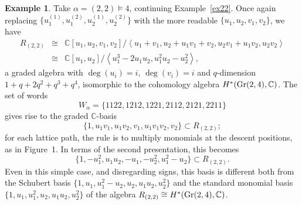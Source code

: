 \documentclass[a4paper,11pt]{amsart}
\theoremstyle{plain}
\theoremstyle{definition}
\newtheorem{example}[theorem]{Example}
\newcommand{\C}{\mathbb{C}}
\begin{document}
\begin{example} Take $\alpha=(2,2)\vDash 4$, continuing Example~\ref{ex22}. Once again replacing $\{u_1^{(1)}, u_1^{(2)}, u_2^{(1)}, u_2^{(2)}\}$ with the more readable $\{u_1, u_2, v_1, v_2\}$, we have
\[\begin{array}{rcl} R_{(2,2)} & \cong & \C[u_1, u_2, v_1,v_2] / \left\langle u_1 + v_1, u_2+u_1v_1+v_2, u_2v_1+u_1v_2, u_2v_2 \right\rangle \\
& \cong & \C[u_1, u_2]/\left\langle u_1^3-2u_1u_2, u_1^2u_2-u_2^2\right\rangle,
\end{array}\]
a graded algebra with $\deg(u_i)=i$, $\deg(v_i)=i$ and $q$-dimension $1+q+2q^2 + q^3+q^4$,
isomorphic to the cohomology algebra $H^*({\rm Gr}(2,4), \C)$.
The set of words 
\[W_\alpha = \{1122, 1212, 1221, 2112, 2121, 2211\}\]
gives rise to the graded $\C$-basis
\[\{1, u_1v_1, u_1v_2, v_1, u_1v_1v_2, v_2\}\subset R_{(2,2)};\]
for each lattice path, the rule is to multiply monomials at the descent positions, as in Figure~1. In terms of the second presentation, this becomes
\[ \{1, -u_1^2, u_1u_2, -u_1,-u_2^2, u_1^2-u_2\}\subset R_{(2,2)}.\]
Even in this simple case, and disregarding signs, this basis is different both from the Schubert basis $\{1,u_1, u_1^2-u_2, u_2, u_1u_2, u_2^2\}$ and the standard monomial basis $\{1,u_1, u_1^2, u_2, u_1u_2, u_2^2\}$ of the algebra $R_{(2,2)}\cong H^*({\rm Gr}(2,4), \C)$.



\end{example}
\end{document}

